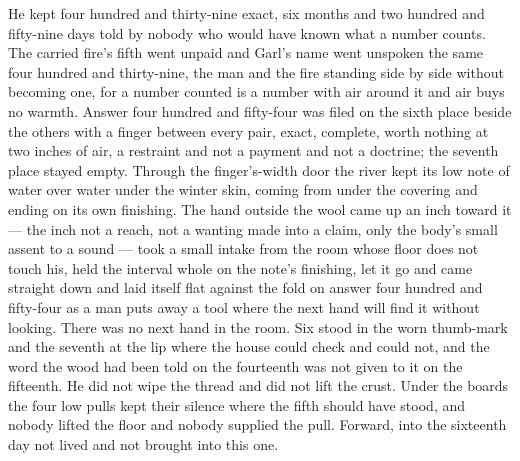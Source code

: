 He kept four hundred and thirty-nine exact, six months and two hundred and fifty-nine days told by nobody who would have known what a number counts. The carried fire's fifth went unpaid and Garl's name went unspoken the same four hundred and thirty-nine, the man and the fire standing side by side without becoming one, for a number counted is a number with air around it and air buys no warmth. Answer four hundred and fifty-four was filed on the sixth place beside the others with a finger between every pair, exact, complete, worth nothing at two inches of air, a restraint and not a payment and not a doctrine; the seventh place stayed empty. Through the finger's-width door the river kept its low note of water over water under the winter skin, coming from under the covering and ending on its own finishing. The hand outside the wool came up an inch toward it --- the inch not a reach, not a wanting made into a claim, only the body's small assent to a sound --- took a small intake from the room whose floor does not touch his, held the interval whole on the note's finishing, let it go and came straight down and laid itself flat against the fold on answer four hundred and fifty-four as a man puts away a tool where the next hand will find it without looking. There was no next hand in the room. Six stood in the worn thumb-mark and the seventh at the lip where the house could check and could not, and the word the wood had been told on the fourteenth was not given to it on the fifteenth. He did not wipe the thread and did not lift the crust. Under the boards the four low pulls kept their silence where the fifth should have stood, and nobody lifted the floor and nobody supplied the pull. Forward, into the sixteenth day not lived and not brought into this one.
